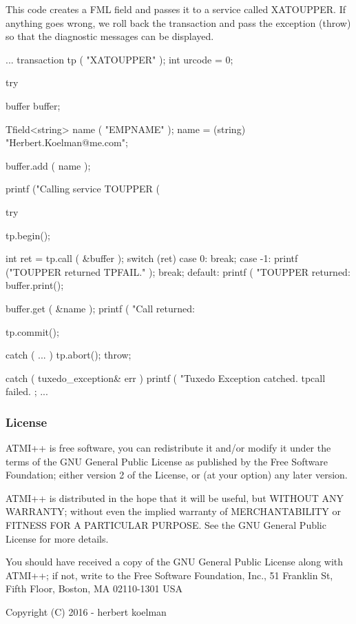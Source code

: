 This code creates a F\+ML field and passes it to a service called {\ttfamily X\+A\+T\+O\+U\+P\+P\+ER}. If anything goes wrong, we roll back the transaction and pass the exception ({\ttfamily throw}) so that the diagnostic messages can be displayed. \begin{DoxyVerb}    ...
    transaction tp ( "XATOUPPER" );
    int urcode = 0;

    try {

      buffer buffer;

      Tfield<string> name ( "EMPNAME" );
      name = (string) "Herbert.Koelman@me.com";

      buffer.add ( name );

      printf ("Calling service TOUPPER (%

      try {

        tp.begin();

        int ret = tp.call ( &buffer );
        switch (ret) {
          case 0:
            break;
          case -1:
            printf ("TOUPPER returned TPFAIL.\n" );
            break;
          default:
            printf ( "TOUPPER returned: %
            buffer.print();
        }

        buffer.get ( &name );
        printf ( "Call returned: %

        tp.commit();
      } catch ( ... ){
        tp.abort();
        throw;
      }

    } catch ( tuxedo_exception& err ) {
      printf ( "Tuxedo Exception catched. tpcall failed. %
    };
    ...
\end{DoxyVerb}


\subsubsection*{License}





A\+T\+M\+I++ is free software, you can redistribute it and/or modify it under the terms of the G\+NU General Public License as published by the Free Software Foundation; either version 2 of the License, or (at your option) any later version.

A\+T\+M\+I++ is distributed in the hope that it will be useful, but W\+I\+T\+H\+O\+UT A\+NY W\+A\+R\+R\+A\+N\+TY; without even the implied warranty of M\+E\+R\+C\+H\+A\+N\+T\+A\+B\+I\+L\+I\+TY or F\+I\+T\+N\+E\+SS F\+OR A P\+A\+R\+T\+I\+C\+U\+L\+AR P\+U\+R\+P\+O\+SE. See the G\+NU General Public License for more details.

You should have received a copy of the G\+NU General Public License along with A\+T\+M\+I++; if not, write to the Free Software Foundation, Inc., 51 Franklin St, Fifth Floor, Boston, MA 02110-\/1301 U\+SA 

 Copyright (C) 2016 -\/ herbert koelman 